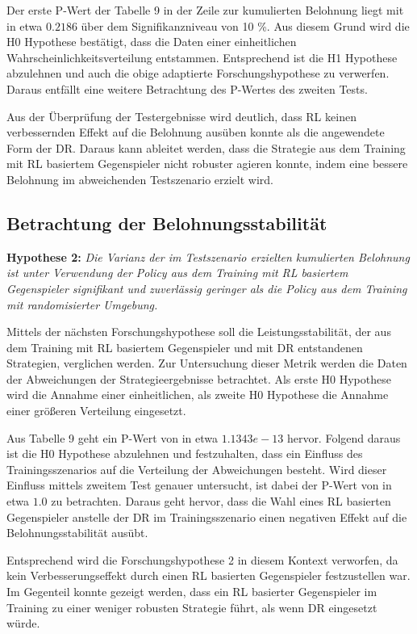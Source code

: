 Der erste P-Wert der Tabelle 9 in der Zeile zur kumulierten Belohnung liegt mit in etwa $0.2186$ über dem Signifikanzniveau von 10 \%.
Aus diesem Grund wird die H0 Hypothese bestätigt, dass die Daten einer einheitlichen Wahrscheinlichkeitsverteilung entstammen.
Entsprechend ist die H1 Hypothese abzulehnen und auch die obige adaptierte Forschungshypothese zu verwerfen.
Daraus entfällt eine weitere Betrachtung des P-Wertes des zweiten Tests.

Aus der Überprüfung der Testergebnisse wird deutlich, dass RL keinen verbessernden Effekt auf die Belohnung ausüben konnte als die angewendete Form der DR.
Daraus kann ableitet werden, dass die Strategie aus dem Training mit RL basiertem Gegenspieler nicht robuster agieren konnte, indem eine bessere Belohnung im abweichenden Testszenario erzielt wird.

\subsection{Betrachtung der Belohnungsstabilität}

\textbf{Hypothese 2:}
\textit{Die Varianz der im Testszenario erzielten kumulierten Belohnung ist unter Verwendung der Policy aus dem Training mit RL basiertem Gegenspieler signifikant und zuverlässig geringer als die Policy aus dem Training mit randomisierter Umgebung.}

Mittels der nächsten Forschungshypothese soll die Leistungsstabilität, der aus dem Training mit RL basiertem Gegenspieler und mit DR entstandenen Strategien, verglichen werden.
Zur Untersuchung dieser Metrik werden die Daten der Abweichungen der Strategieergebnisse betrachtet.
Als erste H0 Hypothese wird die Annahme einer einheitlichen, als zweite H0 Hypothese die Annahme einer größeren Verteilung eingesetzt.

Aus Tabelle 9 geht ein P-Wert von in etwa $1.1343e-13$ hervor.
Folgend daraus ist die H0 Hypothese abzulehnen und festzuhalten, dass ein Einfluss des Trainingsszenarios auf die Verteilung der Abweichungen besteht.
Wird dieser Einfluss mittels zweitem Test genauer untersucht, ist dabei der P-Wert von in etwa $1.0$ zu betrachten.
Daraus geht hervor, dass die Wahl eines RL basierten Gegenspieler anstelle der DR im Trainingsszenario einen negativen Effekt auf die Belohnungsstabilität ausübt.

Entsprechend wird die Forschungshypothese 2 in diesem Kontext verworfen, da kein Verbesserungseffekt durch einen RL basierten Gegenspieler festzustellen war.
Im Gegenteil konnte gezeigt werden, dass ein RL basierter Gegenspieler im Training zu einer weniger robusten Strategie führt, als wenn DR eingesetzt würde.

